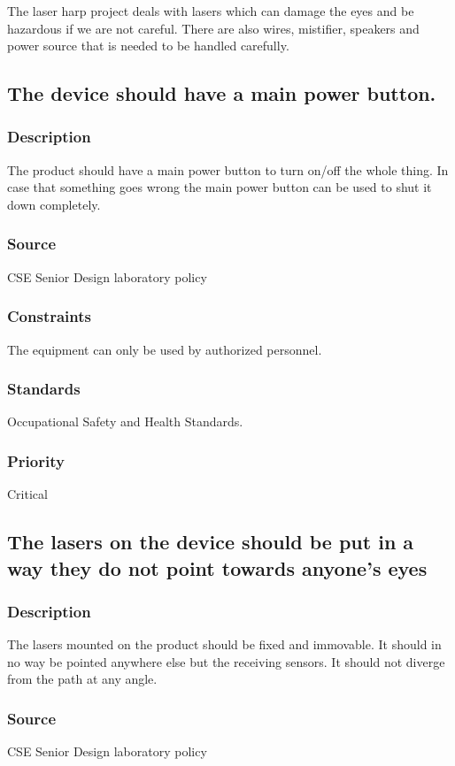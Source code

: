 The laser harp project deals with lasers which can damage the eyes and be hazardous if we are not careful. There are also wires, mistifier, speakers and power source that is needed to be handled carefully.

\subsection{The device should have a main power button.}
\subsubsection{Description}
The product should have a main power button to turn on/off the whole thing. In case that something goes wrong the main power button can be used to shut it down completely.
\subsubsection{Source}
CSE Senior Design laboratory policy
\subsubsection{Constraints}
The equipment can only be used by authorized personnel.
\subsubsection{Standards}
Occupational Safety and Health Standards.
\subsubsection{Priority}
Critical

\subsection{The lasers on the device should be put in a way they do not point towards anyone’s eyes}
\subsubsection{Description}
The lasers mounted on the product should be fixed and immovable. It should in no way be pointed anywhere else but the receiving sensors. It should not diverge from the path at any angle.
\subsubsection{Source}
CSE Senior Design laboratory policy
